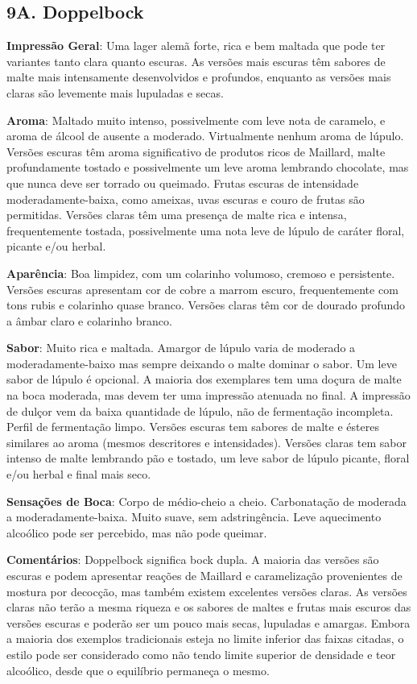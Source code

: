 \subsection*{9A. Doppelbock}
\textbf{Impressão Geral}: Uma lager alemã forte, rica e bem maltada que pode ter variantes tanto clara quanto escuras. As versões mais escuras têm sabores de malte mais intensamente desenvolvidos e profundos, enquanto as versões mais claras são levemente mais lupuladas e secas.

\textbf{Aroma}: Maltado muito intenso, possivelmente com leve nota de caramelo, e aroma de álcool de ausente a moderado. Virtualmente nenhum aroma de lúpulo. Versões escuras têm aroma significativo de produtos ricos de Maillard, malte profundamente tostado e possivelmente um leve aroma lembrando chocolate, mas que nunca deve ser torrado ou queimado. Frutas escuras de intensidade moderadamente-baixa, como ameixas, uvas escuras e couro de frutas são permitidas. Versões claras têm uma presença de malte rica e intensa, frequentemente tostada, possivelmente uma nota leve de lúpulo de caráter floral, picante e/ou herbal.

\textbf{Aparência}: Boa limpidez, com um colarinho volumoso, cremoso e persistente. Versões escuras apresentam cor de cobre a marrom escuro, frequentemente com tons rubis e colarinho quase branco. Versões claras têm cor de dourado profundo a âmbar claro e colarinho branco.

\textbf{Sabor}: Muito rica e maltada. Amargor de lúpulo varia de moderado a moderadamente-baixo mas sempre deixando o malte dominar o sabor. Um leve sabor de lúpulo é opcional. A maioria dos exemplares tem uma doçura de malte na boca moderada, mas devem ter uma impressão atenuada no final. A impressão de dulçor vem da baixa quantidade de lúpulo, não de fermentação incompleta. Perfil de fermentação limpo. Versões escuras tem sabores de malte e ésteres similares ao aroma (mesmos descritores e intensidades). Versões claras tem sabor intenso de malte lembrando pão e tostado, um leve sabor de lúpulo picante, floral e/ou herbal e final mais seco.

\textbf{Sensações de Boca}: Corpo de médio-cheio a cheio. Carbonatação de moderada a moderadamente-baixa. Muito suave, sem adstringência. Leve aquecimento alcoólico pode ser percebido, mas não pode queimar.

\textbf{Comentários}: Doppelbock significa bock dupla. A maioria das versões são escuras e podem apresentar reações de Maillard e caramelização provenientes de mostura por decocção, mas também existem excelentes versões claras. As versões claras não terão a mesma riqueza e os sabores de maltes e frutas mais escuros das versões escuras e poderão ser um pouco mais secas, lupuladas e amargas. Embora a maioria dos exemplos tradicionais esteja no limite inferior das faixas citadas, o estilo pode ser considerado como não tendo limite superior de densidade e teor alcoólico, desde que o equilíbrio permaneça o mesmo.

